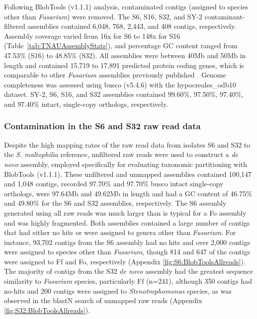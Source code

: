 Following BlobTools (v1.1.1) analysis, contaminated contigs (assigned to species other than \textit{Fusarium}) were removed. The  S6, S16, S32, and SY-2 contaminant-filtered assemblies contained 6,048, 768, 2,443, and 408 contigs, respectively. Assembly coverage varied from 16x for S6 to 148x for S16 (Table~\ref{tab:TNAUAssemblyStats}), and percentage GC content ranged from 47.53\% (S16) to 48.85\% (S32). All assemblies were between 40Mb and 50Mb in length and contained 15,719 to 17,891 predicted protein coding genes, which is comparable to other \textit{Fusarium} assemblies previously published \parencite{Armitage2018, Asai2019, Warmington2019, Cui2021}. Genome completeness was assessed using \ac{busco} (v5.4.6) with the hypocreales\_odb10 dataset. SY-2, S6, S16, and S32 assemblies contained 99.60\%, 97.50\%, 97.40\%, and 97.40\% intact, single-copy orthologs, respectively. 



\subsubsection{Contamination in the S6 and S32 raw read data}
\label{sec:BlobToolsOfS6S32-allreads}

Despite the high mapping rates of the raw read data from isolates S6 and S32 to the \textit{S. maltophilia} reference, unfiltered raw reads were used to construct a \textit{de novo} assembly, employed specifically for evaluating taxonomic partitioning with BlobTools (v1.1.1). These  unfiltered and unmapped assemblies contained 100,147 and 1,048 contigs, recorded  97.70\% and 97.70\% \ac{busco} intact single-copy orthologs, were 97.64Mb and 49.62Mb in length and had a GC content of 46.75\% and 49.80\% for the S6 and S32 assemblies, respectively. The S6 assembly generated using all raw reads was much larger than is typical for a \ac{Fo} assembly and was highly fragmented. Both assemblies contained a large number of contigs that had either no hits or were assigned to genera other than \textit{Fusarium}.  For instance, 93,702 contigs from the  S6 assembly had no hits and over 2,000 contigs were assigned to species other than \textit{Fusarium}, though 814 and 647 of the contigs were  assigned to \ac{Ff} and \ac{Fo}, respectively (Appendix \ref{fig:S6:BlobToolsAllreads}). The majority of contigs from the S32 \textit{de novo} assembly had the greatest sequence similarity to \textit{Fusarium} species, particularly \ac{Ff} (n=241), although 350 contigs had no-hits and 200 contigs were assigned to \textit{Stenotrophomonas} species, as was observed in the \acs{blast}N search of unmapped raw reads (Appendix \ref{fig:S32:BlobToolsAllreads}). 

